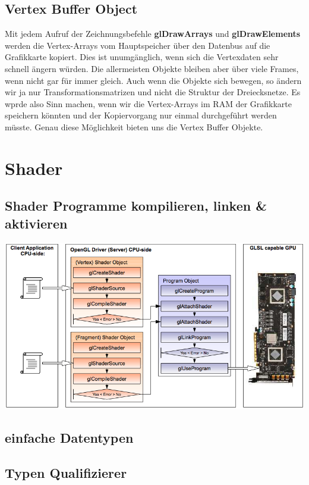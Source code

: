 \documentclass[10pt]{article}
\begin{document}
\subsection{Vertex Buffer Object}
Mit jedem Aufruf der Zeichnungsbefehle \textbf{glDrawArrays} und \textbf{glDrawElements} werden die Vertex-Arrays vom Hauptspeicher über den Datenbus auf die Grafikkarte kopiert. Dies ist unumgänglich, wenn sich die Vertexdaten sehr schnell ängern würden. Die allermeisten Objekte bleiben aber über viele Frames, wenn nicht gar für immer gleich. Auch wenn die Objekte sich bewegen, so ändern wir ja nur Transformationsmatrizen und nicht die Struktur der Dreiecksnetze. Es wprde also Sinn machen, wenn wir die Vertex-Arrays im RAM der Grafikkarte speichern könnten und der Kopiervorgang nur einmal durchgeführt werden müsste. Genau diese Möglichkeit bieten uns die Vertex Buffer Objekte.


\newpage
\section{Shader}
\subsection{Shader Programme kompilieren, linken \& aktivieren}
\begin{center}
	\includegraphics[scale=0.5]{shader.png}
\end{center}
\subsection{einfache Datentypen}

\subsection{Typen Qualifizierer}
\end{document}
